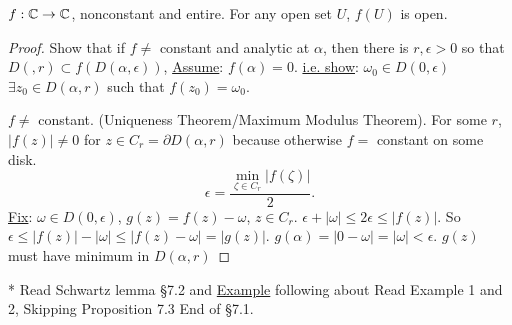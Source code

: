 \documentclass[]{article}
\begin{document}
\begin{theorem}
	 $f:\mathbb{C} \rightarrow \mathbb{C}$, nonconstant and entire. For any open set $U$, $f(U)$ is open.
\end{theorem}
\begin{proof}
	Show that if $f \neq$ constant and analytic at $\alpha$, then there is $r,\epsilon>0$ so that $D(,r) \subset f(D(\alpha,\epsilon))$, \underline{Assume}: $f(\alpha)=0$. \underline{i.e. show}: $\omega_0 \in D(0,\epsilon)$ $\exists z_0\in D(\alpha,r)$ such that $f(z_0) = \omega_0$.
	
	$f\neq$ constant. (Uniqueness Theorem/Maximum Modulus Theorem). For some $r$, $|f(z)| \neq 0$ for $z\in C_r = \partial D(\alpha,r)$ because otherwise $f = $ constant on some disk. $$\epsilon = \frac{\underset{\zeta\in C_r}{\min}|f(\zeta)|}{2}.$$
	\underline{Fix}: $\omega \in D(0,\epsilon)$, $g(z) = f(z) - \omega$, $z\in C_r$. $\epsilon+|\omega| \leq 2\epsilon \leq |f(z)|$. So $\epsilon\leq |f(z)| - |\omega| \leq |f(z) - \omega| = |g(z)|$. $g(\alpha) = |0-\omega| = |\omega| <\epsilon$. $g(z)$ must have minimum in $D(\alpha,r)$
\end{proof}
* Read Schwartz lemma \S7.2 and \underline{Example} following about  Read Example 1 and 2, Skipping Proposition 7.3 End of \S7.1.
\end{document}

